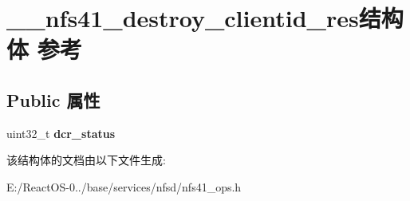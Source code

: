 \hypertarget{struct____nfs41__destroy__clientid__res}{}\section{\+\_\+\+\_\+nfs41\+\_\+destroy\+\_\+clientid\+\_\+res结构体 参考}
\label{struct____nfs41__destroy__clientid__res}
\subsection*{Public 属性}
\begin{DoxyCompactItemize}
\item 
\mbox{\label{struct____nfs41__destroy__clientid__res_ae80b021b6a9ed65e1b0c379664cb84ad}} 
uint32\+\_\+t {\bfseries dcr\+\_\+status}
\end{DoxyCompactItemize}


该结构体的文档由以下文件生成\+:\begin{DoxyCompactItemize}
\item 
E\+:/\+React\+O\+S-\/0../base/services/nfsd/nfs41\+\_\+ops.\+h\end{DoxyCompactItemize}

